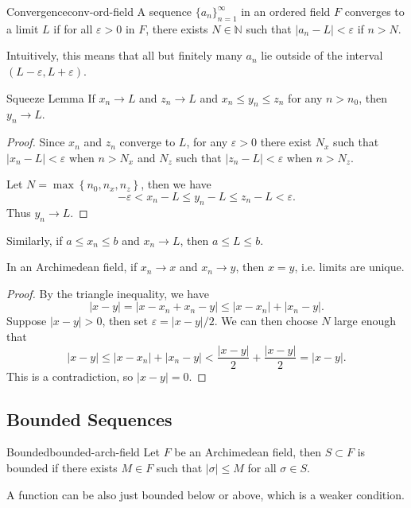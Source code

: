 \documentclass[10pt]{report}
\begin{document}
\begin{defn}{Convergence}{conv-ord-field}
	A sequence $\{a_n\}_{n=1}^\infty$ in an ordered field $F$ converges to a limit $L$ if for all $\varepsilon > 0$ in $F$, there exists $N \in \mathbb{N}$ such that $|a_n - L| < \varepsilon$ if $n > N$.
\end{defn}

Intuitively, this means that all but finitely many $a_n$ lie outside of the interval $(L-\varepsilon, L+\varepsilon)$.

\begin{prop}{Squeeze Lemma}
	If $x_n \to L$ and $z_n \to L$ and $x_n \leq y_n \leq z_n$ for any $n > n_0$, then $y_n \to L$.
\end{prop}
\begin{proof}
Since $x_n$ and $z_n$ converge to $L$, for any $\varepsilon>0$ there exist $N_x$ such that $|x_n-L| < \varepsilon$ when $n > N_x$ and $N_z$ such that $|z_n-L|<\varepsilon$ when $n > N_z$.

Let $N = \max\left\{ n_0, n_x, n_z \right\}$, then we have
\[
-\varepsilon < x_n - L \leq y_n - L \leq z_n - L < \varepsilon.
\] Thus $y_n \to L$.
\end{proof}

Similarly, if $a \leq x_n \leq b$ and $x_n \to L$, then $a \leq L \leq b$.

\begin{prop}
	In an Archimedean field, if $x_n \to x$ and $x_n \to y$, then $x=y$, i.e. limits are unique.
\end{prop}
\begin{proof}
	By the triangle inequality, we have
	\[
	|x-y| = |x-x_n+x_n-y| \leq |x-x_n|+|x_n-y|.
	\] 
	Suppose $|x-y| > 0$, then set $\varepsilon = |x-y|/2$. We can then choose $N$ large enough that
	\[
	|x-y|\leq |x-x_n|+|x_n-y| < \frac{|x-y|}{2} + \frac{|x-y|}{2} = |x-y|.
	\] 
	This is a contradiction, so $|x-y| = 0$.
\end{proof}

\subsection{Bounded Sequences}

\begin{defn}{Bounded}{bounded-arch-field}
	Let $F$ be an Archimedean field, then $S \subset F$ is bounded if there exists $M \in F$ such that $|\sigma| \leq M$ for all $\sigma \in S$.
\end{defn}
A function can be also just bounded below or above, which is a weaker condition.
\end{document}

